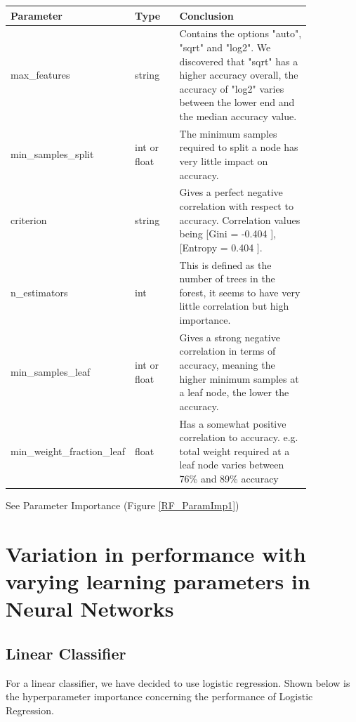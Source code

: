 \documentclass[11pt]{article}
\begin{document}
\begin{table}[ht]
  \centering
  \begin{tabular}{|p{0.25\linewidth} | p{0.15 \linewidth} | p{0.45\linewidth}|} 
    \hline
    \textbf{Parameter}  & \textbf{Type} & \textbf{Conclusion} \\ \hline
    max\_features & string & Contains the options "auto", "sqrt" and "log2". We discovered that "sqrt" has a higher accuracy overall, the accuracy of "log2" varies between the lower end and the median accuracy value.\\ \hline
    min\_samples\_split & int or float & The minimum samples required to split a node has very little impact on accuracy.  \\ \hline
    criterion & string & Gives a perfect negative correlation with respect to accuracy. Correlation values being [Gini = -0.404 ], [Entropy = 0.404 ]. \\ \hline
    n\_estimators & int & This is defined as the number of trees in the forest, it seems to have very little correlation but high importance. \\ \hline
    min\_samples\_leaf & int or float & Gives a strong negative correlation in terms of accuracy, meaning the higher minimum samples at a leaf node, the lower the accuracy. \\ \hline
    min\_weight\_fraction\_leaf & float & Has a somewhat positive correlation to accuracy. e.g. total weight required at a leaf node varies between 76\% and 89\% accuracy\\ \hline
  \end{tabular}
\end{table}\label{RF_Analysis_Table}
See Parameter Importance (Figure \ref{RF_ParamImp1})

\newpage
\section{Variation in performance with varying learning parameters in Neural Networks}
\subsection{Linear Classifier}

For a linear classifier, we have decided to use logistic regression. \cite{SklearnLinearModel}
Shown below is the hyperparameter importance concerning the performance of Logistic Regression.
\end{document}
